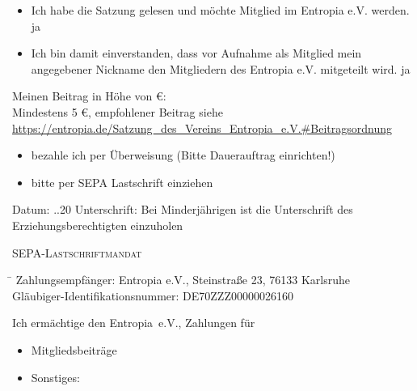 \documentclass{scrartcl}
\begin{document}
\begin{itemize}
\item[] Ich habe die Satzung gelesen und m\"ochte Mitglied im Entropia e.V. werden.  \Square ja
\item[] Ich bin damit einverstanden, dass vor Aufnahme als Mitglied mein angegebener Nickname den Mitgliedern des Entropia e.V. mitgeteilt wird.  \Square ja
\end{itemize}
Meinen Beitrag in Höhe von \underline{\hspace{30pt}} €:\\
{\tiny Mindestens 5 €, empfohlener Beitrag siehe \url{https://entropia.de/Satzung_des_Vereins_Entropia_e.V.#Beitragsordnung}}
\begin{itemize}
\item[\Square] bezahle ich per \"Uberweisung (Bitte Dauerauftrag einrichten!)
\item[\Square] bitte per SEPA Lastschrift einziehen
\end{itemize}
\addvspace{0.4cm}

Datum: \hspace{2pt} \underline{\hspace{20pt}}.\underline{\hspace{20pt}}.20\underline{\hspace{20pt}} Unterschrift: \hspace{2pt} \underline{\hspace{10cm}} 
\footnotesize
Bei Minderj\"ahrigen ist die Unterschrift des Erziehungsberechtigten einzuholen
\normalsize

\addvspace{0.2cm}

\addvspace{1cm}
\begin{center}\begin{Large} \textsc{SEPA-Lastschriftmandat}\end{Large}\end{center}
\begin{tabbing}
\hspace*{7cm}\= \hspace*{7cm} \kill
Zahlungsempf\"anger: \> Entropia e.V., Steinstra{\ss}e 23, 76133 Karlsruhe\\

Gl\"aubiger-Identifikationsnummer: \> DE70ZZZ00000026160
\end{tabbing}
Ich erm\"achtige den Entropia~e.\thinspace V., Zahlungen f\"ur

\begin{itemize}
  \item[\Square] Mitgliedsbeitr\"age
  \item[\Square] Sonstiges: \hrulefill
\end{itemize}
\end{document}
